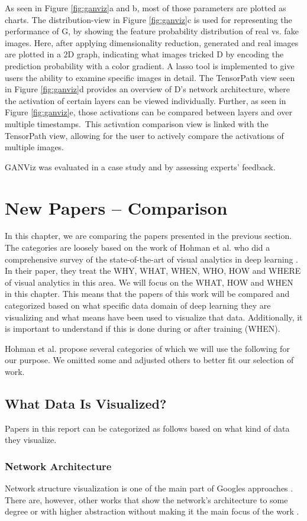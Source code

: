 \documentclass{acmsiggraph}               %
\begin{document}
As seen in Figure \ref{fig:ganviz}a and b, most of those parameters are plotted as charts. The distribution-view in Figure \ref{fig:ganviz}c is used for representing the performance of G, by showing the feature probability distribution of real vs. fake images. Here, after applying dimensionality reduction, generated and real images are plotted in a 2D graph, indicating what images tricked D by encoding the prediction probability with a color gradient. A lasso tool is implemented to give users the ability to examine specific images in detail. The TensorPath view seen in Figure \ref{fig:ganviz}d provides an overview of D's network architecture, where the activation of certain layers can be viewed individually. Further, as seen in Figure \ref{fig:ganviz}e, those activations can be compared between layers and over multiple timestamps. This activation comparison view is linked with the TensorPath view, allowing for the user to actively compare the activations of multiple images.

GANViz was evaluated in a case study and by assessing experts' feedback.

\section{New Papers -- Comparison}
In this chapter, we are comparing the papers presented in the previous section. 
The categories are loosely based on the work of Hohman et al. who did a comprehensive survey of the state-of-the-art of visual analytics in deep learning \cite{Hohman2018}.
In their paper, they treat the WHY, WHAT, WHEN, WHO, HOW and WHERE of visual analytics in this area.
We will focus on the WHAT, HOW and WHEN in this chapter. This means that the papers of this work will be compared and categorized based on what specific data domain of deep learning they are visualizing and what means have been used to visualize that data. Additionally, it is important to understand if this is done during or after training (WHEN).

Hohman et al. propose several categories of which we will use the following for our purpose. We omitted some and adjusted others to better fit our selection of work.

\subsection{What Data Is Visualized?}
Papers in this report can be categorized as follows based on what kind of data they visualize.
\subsubsection{Network Architecture}
Network structure visualization is one of the main part of Googles approaches \cite{Wongsuphasawat2018,Smilkov2017}.
There are, however, other works that show the network's architecture to some degree or with higher abstraction without making it the main focus of the work \cite{Liu2016,Liu2018}.
\end{document}
